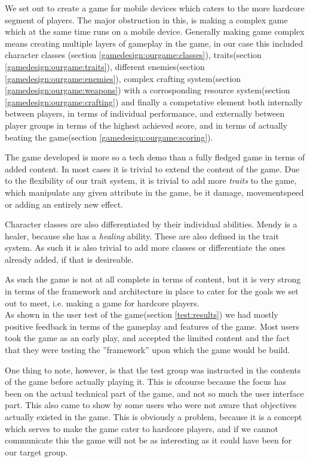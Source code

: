 We set out to create a game for mobile devices which caters to the more hardcore segment of players. The major obstruction in this, is making a complex game which at the same time runs on a mobile device. Generally making  game complex means creating multiple layers of gameplay in the game, in our case this included character classes (section \ref{gamedesign:ourgame:classes}), traits(section \ref{gamedesign:ourgame:traits}), different enemies(section \ref{gamedesign:ourgame:enemies}), complex crafting system(section \ref{gamedesign:ourgame:weapons}) with a corrosponding resource system(section \ref{gamedesign:ourgame:crafting}) and finally a competative element both internally between players, in terms of individual performance, and externally between player groups in terms of the highest achieved score, and in terms of actually beating the game(section \ref{gamedesign:ourgame:scoring}).

The game developed is more so a tech demo than a fully fledged game in terms of added content. In most cases it is trivial to extend the content of the game. Due to the flexibility of our trait system, it is trivial to add more \emph{traits} to the game, which manipulate any given attribute in the game, be it damage, movementspeed or adding an entirely new effect. 

Character classes are also differentiated by their individual abilities. Mendy is a healer, because she has a \emph{healing} ability. These are also defined in the trait system. As such it is also trivial to add more classes or differentiate the ones already added, if that is desireable.

As such the game is not at all complete in terms of content, but it is very strong in terms of the framework and architecture in place to cater for the goals we set out to meet, i.e. making a game for hardcore players. \\

As shown in the user test of the game(section \ref{test:results}) we had mostly positive feedback in terms of the gameplay and features of the game. Most users took the game as an early play, and accepted the limited content and the fact that they were testing the ''framework'' upon which the game would be build.

One thing to note, however, is that the test group was instructed in the contents of the game before actually playing it. This is ofcourse because the focus has been on the actual technical part of the game, and not so much the user interface part. This also came to show by some users who were not aware that objectives actually existed in the game. This is obviously a problem, because it is a concept which serves to make the game cater to hardcore players, and if we cannot communicate this the game will not be as interesting as it could have been for our target group.


